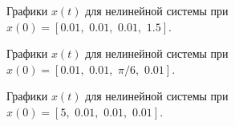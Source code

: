 \begin{figure}[!h]
	\caption{Графики $x(t)$ для нелинейной системы при $x(0)=[0.01, \, \, 0.01, \, \, 0.01, \, \, 1.5]$.}
	\label{6_lqr_n2}
\end{figure}

\begin{figure}[!h]
	\caption{Графики $x(t)$ для нелинейной системы при $x(0)=[0.01, \, \, 0.01, \, \, \pi / 6, \, \, 0.01]$.}
	\label{6_lqr_n3}
\end{figure}

\begin{figure}[!h]
	\caption{Графики $x(t)$ для нелинейной системы при $x(0)=[5, \, \, 0.01, \, \, 0.01, \, \, 0.01]$.}
	\label{6_lqr_n4}
\end{figure}

